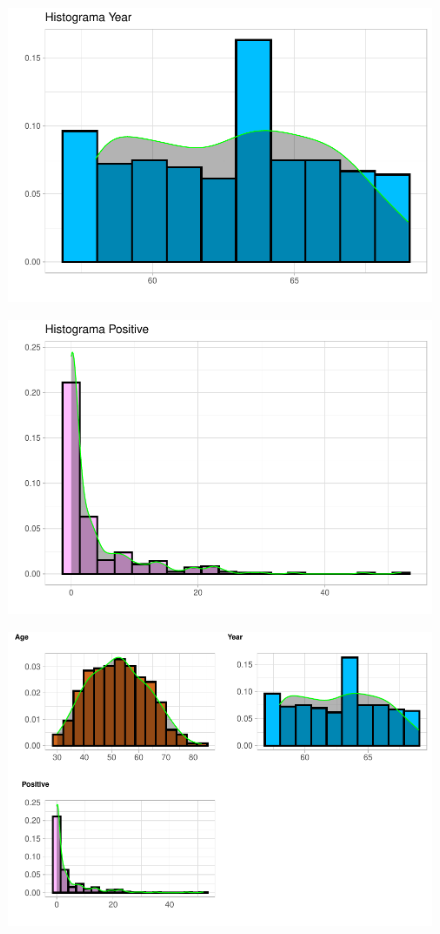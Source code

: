 \begin{figure}[H]\includegraphics[width=.9\linewidth]{img/EDA2_files/figure-latex/unnamed-chunk-10-2} \caption{}\end{figure}

\begin{figure}[H]\includegraphics[width=.9\linewidth]{img/EDA2_files/figure-latex/unnamed-chunk-10-3} \caption{}\end{figure}

\begin{figure}[H]\includegraphics[width=.9\linewidth]{img/EDA2_files/figure-latex/unnamed-chunk-10-4} \caption{}\end{figure}

